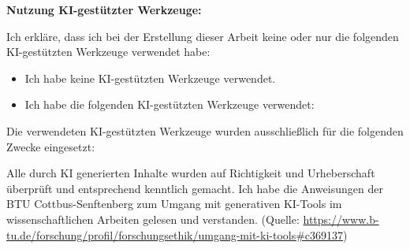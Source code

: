 {{        \vspace{0.8cm}
        {\large\bfseries\sffamily Nutzung KI-gestützter Werkzeuge:\par}
        \vspace{0.3cm}

        Ich erkläre, dass ich bei der Erstellung dieser Arbeit keine oder nur die folgenden KI-gestützten Werkzeuge verwendet habe:

        \vspace{0.3cm}
        \begin{itemize}[leftmargin=1.5em, labelsep=0.8em]
            \item[\ifthenelse{\boolean{AiUsed}}{$\square$}{$\boxtimes$}] 
            Ich habe keine KI-gestützten Werkzeuge verwendet.

            \item[\ifthenelse{\boolean{AiUsed}}{$\boxtimes$}{$\square$}] 
            Ich habe die folgenden KI-gestützten Werkzeuge verwendet:
        \end{itemize}

        \vspace{0.3cm}
        Die verwendeten KI-gestützten Werkzeuge wurden ausschließlich für die folgenden Zwecke eingesetzt:
        \vspace{0.2cm}


        \vspace{0.4cm}
        Alle durch KI generierten Inhalte wurden auf Richtigkeit und Urheberschaft überprüft und entsprechend kenntlich gemacht. Ich habe die Anweisungen der BTU Cottbus-Senftenberg zum Umgang mit generativen KI-Tools im wissenschaftlichen Arbeiten gelesen und verstanden. (Quelle: \url{https://www.b-tu.de/forschung/profil/forschungsethik/umgang-mit-ki-tools\#c369137})

}}
